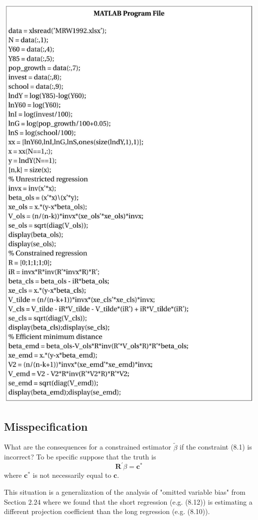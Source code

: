 \documentclass[10pt]{article}
\begin{document}
\includegraphics[max width=\textwidth]{2022_09_17_fb390717b501da243396g-17}

\subsection{Misspecification}
What are the consequences for a constrained estimator $\widetilde{\beta}$ if the constraint (8.1) is incorrect? To be specific suppose that the truth is
$$
\boldsymbol{R}^{\prime} \beta=\boldsymbol{c}^{*}
$$
where $\boldsymbol{c}^{*}$ is not necessarily equal to $\boldsymbol{c}$.

This situation is a generalization of the analysis of "omitted variable bias" from Section $2.24$ where we found that the short regression (e.g. (8.12)) is estimating a different projection coefficient than the long regression (e.g. (8.10)).
\end{document}
